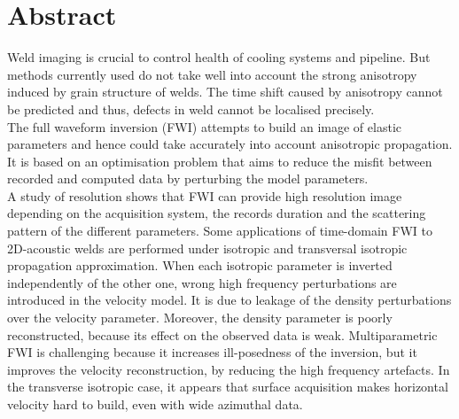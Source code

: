 \section*{Abstract}

Weld imaging is crucial to control health of cooling systems and pipeline. But methods currently used do not take well into account the strong anisotropy induced by grain structure of welds. The time shift caused by anisotropy cannot be predicted and thus, defects in weld cannot be localised precisely. \\

The full waveform inversion (FWI) attempts to build an image of elastic parameters and hence could take accurately into account anisotropic propagation. It is based on an optimisation problem that aims to reduce the misfit between recorded and computed data by perturbing the model parameters. \\

A study of resolution shows that FWI can provide high resolution image depending on the acquisition system, the records duration and the scattering pattern of the different parameters. Some applications of time-domain FWI to 2D-acoustic welds are performed under isotropic and transversal isotropic propagation approximation. When each isotropic parameter is inverted independently of the other one, wrong high frequency perturbations are introduced in the velocity model. It is due to leakage of the density perturbations over the velocity parameter. Moreover, the density parameter is poorly reconstructed, because its effect on the observed data is weak. Multiparametric FWI is challenging because it increases ill-posedness of the inversion, but it improves the velocity reconstruction, by reducing the high frequency artefacts. In the transverse isotropic case, it appears that surface acquisition makes horizontal velocity hard to build, even with wide azimuthal data. 








